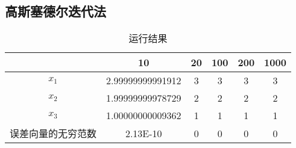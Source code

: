 \subsection{高斯塞德尔迭代法}

\qa 
\begin{table}[H]
	\centering
	\caption{运行结果}
	\begin{tabular}{c|ccccc}
		& 10    & 20    & 100   & 200   & 1000 \\
		\hline
		$x_1$    & 2.99999999991912 & 3     & 3     & 3     & 3 \\
		$x_2$    & 1.99999999978729 & 2     & 2     & 2     & 2 \\
		$x_3$    & 1.00000000009362 & 1     & 1     & 1     & 1 \\
		误差向量的无穷范数 & 2.13E-10 & 0     & 0     & 0     & 0 \\
	\end{tabular}%
	\label{tab:addlabel15-2}%
\end{table}%

